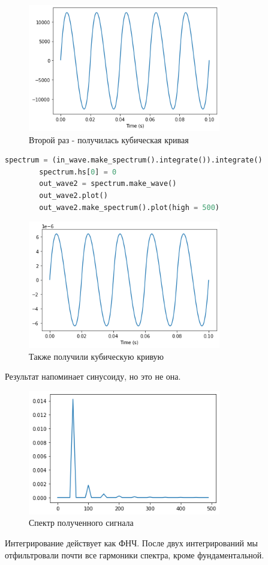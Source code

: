 \documentclass[a4paper, 12pt]{report}
\begin{document}
	\begin{figure}[H]
		\centering
		\includegraphics[width=0.75\textwidth]{task9.png}
		\caption{Второй раз - получилась кубическая кривая}
		\label{fig:task9}
	\end{figure}
	\begin{lstlisting}[language=Python,caption=Два раза интегрируем и строим спектр]
		spectrum = (in_wave.make_spectrum().integrate()).integrate()
		spectrum.hs[0] = 0
		out_wave2 = spectrum.make_wave()
		out_wave2.plot()
		out_wave2.make_spectrum().plot(high = 500)
	\end{lstlisting}
	\begin{figure}[H]
		\centering
		\includegraphics[width=0.75\textwidth]{task10.png}
		\caption{Также получили кубическую кривую}
		\label{fig:task10}
	\end{figure}
	Результат напоминает синусоиду, но это не она.
	\begin{figure}[H]
		\centering
		\includegraphics[width=0.75\textwidth]{task11.png}
		\caption{Спектр полученного сигнала}
		\label{fig:task11}
	\end{figure}
	Интегрирование действует как ФНЧ. После двух интегрирований мы отфильтровали почти все гармоники спектра, кроме фундаментальной.
\end{document}
